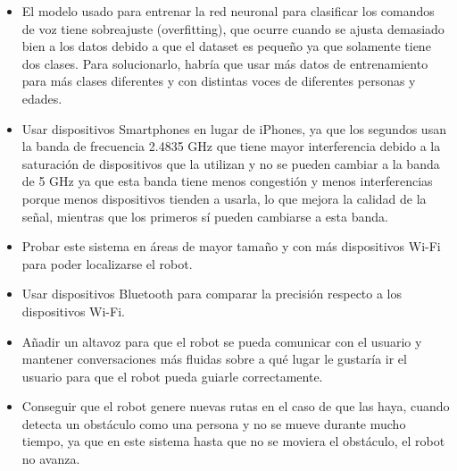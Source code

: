 \begin{itemize}

 \item \textit{} El modelo usado para entrenar la red neuronal para clasificar los comandos de voz tiene sobreajuste (overfitting), que ocurre cuando se ajusta demasiado bien a los datos debido a que el dataset es pequeño ya que solamente tiene dos clases. Para solucionarlo, habría que usar más datos de entrenamiento para más clases diferentes y con distintas voces de diferentes personas y edades.
 
 \item \textit{} Usar dispositivos Smartphones en lugar de iPhones, ya que los segundos usan la banda de frecuencia 2.4835 GHz que tiene mayor interferencia debido a la saturación de dispositivos que la utilizan y no se pueden cambiar a la banda de 5 GHz ya que esta banda tiene menos congestión y menos interferencias porque menos dispositivos tienden a usarla, lo que mejora la calidad de la señal, mientras que los primeros sí pueden cambiarse a esta banda.
 \item \textit{} Probar este sistema en áreas de mayor tamaño y con más dispositivos Wi-Fi para poder localizarse el robot.
  \item \textit{} Usar dispositivos Bluetooth para comparar la precisión respecto a los dispositivos Wi-Fi.
  \item \textit{} Añadir un altavoz para que el robot se pueda comunicar con el usuario y mantener conversaciones más fluidas sobre a qué lugar le gustaría ir el usuario para que el robot pueda guiarle correctamente.
 \item \textit{} Conseguir que el robot genere nuevas rutas en el caso de que las haya, cuando detecta un obstáculo como una persona y no se mueve durante mucho tiempo, ya que en este sistema hasta que no se moviera el obstáculo, el robot no avanza.
\end{itemize}\



